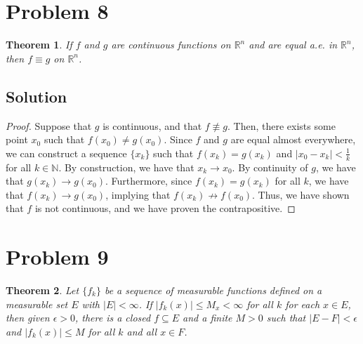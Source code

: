 \documentclass[10pt,a4paper]{article}
\theoremstyle{theorem}
\newtheorem{theorem}{Theorem}
\theoremstyle{definition}
\begin{document}
\section*{Problem 8}
\begin{theorem}
If $f$ and $g$ are continuous functions on $\mathbb{R}^n$ and are equal a.e. in $\mathbb{R}^n$, then $f \equiv g$ on $\mathbb{R}^n$.
\end{theorem}

\subsection*{Solution}
\begin{proof}
Suppose that $g$ is continuous, and that $f \not \equiv g$. Then, there exists some point $x_0$ such that $f(x_0) \not = g(x_0)$. Since $f$ and $g$ are equal almost everywhere, we can construct a sequence $\{x_k\}$ such that $f(x_k) = g(x_k)$ and $|x_0 - x_k| < \frac{1}{k}$ for all $k \in \mathbb{N}$. By construction, we have that $x_k \to x_0$. By continuity of $g$, we have that $g(x_k) \to g(x_0)$.  Furthermore, since $f(x_k) = g(x_k)$ for all $k$, we have that $f(x_k) \to g(x_0)$,  implying that $f(x_k) \not \to f(x_0)$. Thus, we have shown that $f$ is not continuous, and we have proven the contrapositive. 
\end{proof}

\section*{Problem 9}
\begin{theorem}
Let $\{f_k \}$ be a sequence of measurable functions defined on a measurable set $E$ with $|E| < \infty$. If $|f_k(x)| \leq M_x < \infty$ for all $k$ for each $x \in E$, then given $\epsilon > 0$, there is a closed $f \subseteq E$ and a finite $M > 0$ such that $|E - F| < \epsilon$ and $|f_k(x)| \leq M$ for all $k$ and all $x \in F$.
\end{theorem}
\end{document}
